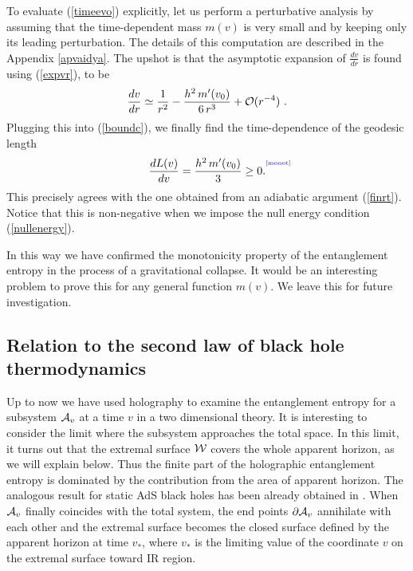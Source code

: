 \documentclass[12pt]{article}
\newcommand{\be}{\begin{equation}}
\newcommand{\ee}{\end{equation}}
\def\req#1{(\ref{#1})}
\def\App#1{Appendix \ref{#1}}
\def\CA{{\cal A}}
\def\CO{{\cal O}}
\def\CW{{\cal W}}
\def\f#1#2{{\frac{#1}{#2}}}
\def\f#1#2{{\frac{#1}{#2}}}
\def\Label#1{\label{#1}%
{ \color{blue}{\smash{\hbox to0pt{\raise2ex\hbox{\tiny[#1]}\hss}}}}}
\def\Gms{\CW}
\def\rA{\CA}
\def\de{\partial}
\def\f {\frac}
\begin{document}
To evaluate \req{timeevo} explicitly, let us perform a perturbative
analysis by assuming that the time-dependent mass $m(v)$ is very
small and by keeping only its leading perturbation. The details of
this computation are described in the \App{apvaidya}. The
upshot is that the asymptotic expansion of $\f{dv}{dr}$ is found using (\ref{expvr}),
to be
%
\be \f{dv}{dr}\simeq
\f{1}{r^2}-\f{h^2 \, m'(v_0)}{6\,r^3}+\CO(r^{-4}) \ . \ee
%
Plugging this into \req{boundc}, we finally find the time-dependence of the
geodesic length
%
\be \f{dL(v)}{dv}=\f{h^2 \, m'(v_0)}{3}\geq
0.\Label{monot}\ee
%
This precisely agrees with the one obtained from
an adiabatic argument \req{finrt}. Notice that this is non-negative
when we impose the null energy condition \req{nullenergy}.

In this way we have confirmed the monotonicity property of the
entanglement entropy in the process of a gravitational collapse. It
would be an interesting problem to prove this for any general
function $m(v)$. We leave this for future investigation.


\subsection{Relation to the second law of black hole thermodynamics}
\label{totent}

Up to now we have used holography to examine the entanglement
entropy for a subsystem $\rA_v$ at a time $v$ in a two dimensional
theory. It is interesting to consider the limit where the subsystem
approaches the total space. In this limit,  it turns out that the
extremal surface $\Gms$ covers the whole apparent horizon, as we
will explain below. Thus the finite part of the holographic
entanglement entropy is dominated by the contribution from the area
of apparent horizon. The analogous result for static AdS black holes
has been already obtained in \cite{Ryu:2006bv, Ryu:2006ef}. When
$\rA_v$ finally coincides with the total system, the end points $\de
\rA_v$ annihilate with each other and the extremal surface becomes
the closed surface defined by the apparent horizon at time $v_*$,
where $v_*$ is the limiting value of the coordinate $v$ on the
extremal surface toward IR region. 
\end{document}
